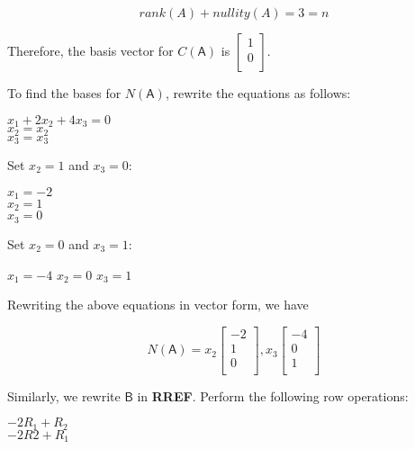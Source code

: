 \documentclass[a4paper, 11pt]{article}
\newcommand{\mat}[1]{\boldsymbol { \mathsf{#1}} }
\begin{document}
\begin{enumerate}
\begin{equation*}
    rank(A) + nullity(A) = 3 = n
\end{equation*}

Therefore, the basis vector for $C(\mat{A})$ is $\begin{bmatrix}
1 \\
0 \\
\end{bmatrix}$.

To find the bases for $N(\mat{A})$, rewrite the equations as follows:
\begin{center}
    $x_1 + 2x_2 + 4x_3 = 0$\\
    $x_2 = x_2$ \\
    $x_3 = x_3$ \\
\end{center}

Set $x_2 = 1$ and $x_3 = 0$:

\begin{center}
    $x_1  = -2$ \\
    $x_2 = 1$ \\
    $x_3 = 0$ \\
\end{center}

Set $x_2 = 0$ and $x_3 = 1$:

\begin{center}
    $x_1 = -4$
    $x_2 = 0$
    $x_3 = 1$
\end{center}

Rewriting the above equations in vector form, we have

\begin{equation*}
    N(\mat{A}) = x_2 
    \begin{bmatrix}
    -2 \\
    1 \\
    0 \\
    \end{bmatrix},
    x_3
    \begin{bmatrix}
    -4 \\
    0 \\
    1 \\
    \end{bmatrix}
\end{equation*}

Similarly, we rewrite $\mat{B}$ in \textbf{RREF}. Perform the following row operations:

\begin{center}
	$-2R_1 + R_2$ \\
	$-2R2 + R_1$ \\
\end{center}


\end{enumerate}
\end{document}
